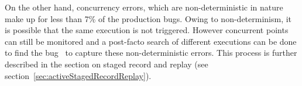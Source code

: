 On the other hand, concurrency errors, which are non-deterministic in nature make up for less than 7\% of the production bugs.
Owing to non-determinism, it is possible that the same execution is not triggered. However concurrent points can still be monitored and a post-facto search of different executions can be done to find the bug~\cite{dpor,systematicDPORconcurrency} to capture these non-deterministic errors. This process is further described in the section on staged record and replay (see section~\ref{sec:activeStagedRecordReplay}).  \\ \\



